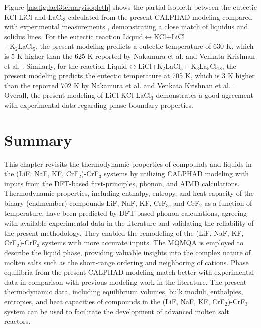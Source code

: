 Figure \ref{ms:fig:lacl3ternaryisopleth} shows the partial isopleth between the eutectic KCl-LiCl and LaCl$_3$ calculated from the present CALPHAD modeling compared with experimental measurements \cite{nakamura1997thermal, venkata2006pseudo}, demonstrating a close match of liquidus and solidus lines. For the eutectic reaction Liquid$\leftrightarrow$KCl+LiCl\\+K$_2$LaCl$_5$, the present modeling predicts a eutectic temperature of 630 K, which is 5 K higher than the 625 K reported by Nakamura et al. \cite{nakamura1997thermal} and Venkata Krishnan et al. \cite{venkata2006pseudo}. Similarly, for the reaction Liquid$\leftrightarrow$LiCl+K$_2$LaCl$_5$+ K$_3$La$_5$Cl$_{18}$, the present modeling predicts the eutectic temperature at 705 K, which is 3 K higher than the reported 702 K by Nakamura et al. \cite{nakamura1997thermal} and Venkata Krishnan et al. \cite{venkata2006pseudo}. Overall, the present modeling of LiCl-KCl-LaCl$_3$ demonstrates a good agreement with experimental data \cite{bagri2016determination,samin2016estimation,nakamura1997thermal, venkata2006pseudo} regarding phase boundary properties. 

\section{Summary} \label{moltensalts:sec:Summary}
This chapter revisits the thermodynamic properties of compounds and liquids in the (LiF, NaF, KF, CrF$_2$)-CrF$_3$ systems by utilizing CALPHAD modeling with inputs from the DFT-based first-principles, phonon, and AIMD calculations. Thermodynamic properties, including enthalpy, entropy, and heat capacity of the binary (endmember) compounds LiF, NaF, KF, CrF$_3$, and CrF$_2$ as a function of temperature, have been predicted by DFT-based phonon calculations, agreeing with available experimental data in the literature and validating the reliability of the present methodology. They enabled the remodeling of the (LiF, NaF, KF, CrF$_2$)-CrF$_3$ systems with more accurate inputs. The MQMQA is employed to describe the liquid phase, providing valuable insights into the complex nature of molten salts such as the short-range ordering and neighboring of cations. Phase equilibria from the present CALPHAD modeling match better with experimental data in comparison with previous modeling work in the literature. The present thermodynamic data, including equilibrium volumes, bulk moduli, enthalpies, entropies, and heat capacities of compounds in the (LiF, NaF, KF, CrF$_2$)-CrF$_3$ system can be used to facilitate the development of advanced molten salt reactors.

